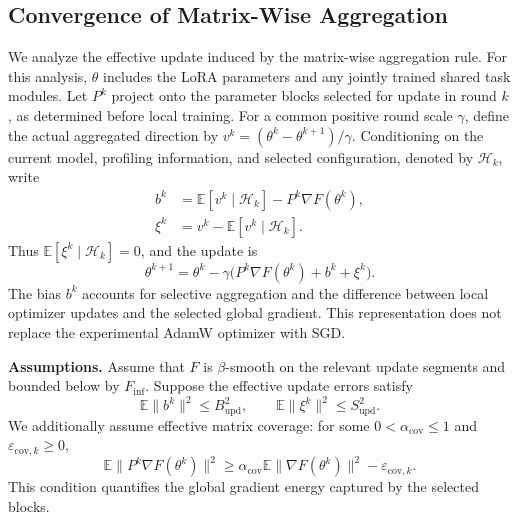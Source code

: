 \documentclass[10pt,conference,letterpaper]{IEEEtran}
\begin{document}
\subsection{Convergence of Matrix-Wise Aggregation}
\label{sec:fm-convergence}
We analyze the effective update induced by the matrix-wise aggregation rule. For this analysis, $\theta$ includes the LoRA parameters and any jointly trained shared task modules. Let $P^k$ project onto the parameter blocks selected for update in round $k$, as determined before local training. For a common positive round scale $\gamma$, define the actual aggregated direction by $v^k=(\theta^k-\theta^{k+1})/\gamma$. Conditioning on the current model, profiling information, and selected configuration, denoted by $\mathcal H_k$, write
\begin{align}
 b^k&=\mathbb E[v^k\mid\mathcal H_k]-P^k\nabla F(\theta^k),\\
 \xi^k&=v^k-\mathbb E[v^k\mid\mathcal H_k].
\end{align}
Thus $\mathbb E[\xi^k\mid\mathcal H_k]=0$, and the update is
\begin{equation}
 \theta^{k+1}=\theta^k-\gamma\bigl(P^k\nabla F(\theta^k)+b^k+\xi^k\bigr).
\end{equation}
The bias $b^k$ accounts for selective aggregation and the difference between local optimizer updates and the selected global gradient. This representation does not replace the experimental AdamW optimizer with SGD.

\noindent\textbf{Assumptions.}
Assume that $F$ is $\beta$-smooth on the relevant update segments and bounded below by $F_{\inf}$. Suppose the effective update errors satisfy
\begin{equation}
 \mathbb E\|b^k\|^2\le B_{\mathrm{upd}}^2,\qquad
 \mathbb E\|\xi^k\|^2\le S_{\mathrm{upd}}^2.
\end{equation}
We additionally assume effective matrix coverage: for some $0<\alpha_{\mathrm{cov}}\le1$ and $\varepsilon_{\mathrm{cov},k}\ge0$,
\begin{equation}
 \mathbb E\|P^k\nabla F(\theta^k)\|^2
 \ge\alpha_{\mathrm{cov}}\mathbb E\|\nabla F(\theta^k)\|^2
       -\varepsilon_{\mathrm{cov},k}.
\end{equation}
This condition quantifies the global gradient energy captured by the selected blocks.
\end{document}
